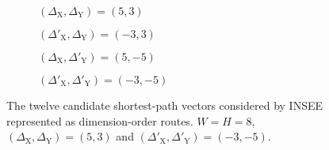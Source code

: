 			\begin{figure}
				\center
				\begin{subfigure}{0.45\linewidth}
					\center
					\caption{$(\Delta_\textrm{X}, \Delta_\textrm{Y}) = (5,3)$}
					\label{fig:insee-vector-candidates-no-wrap}
				\end{subfigure}
				\begin{subfigure}{0.45\linewidth}
					\center
					\caption{$(\Delta'_\textrm{X}, \Delta_\textrm{Y}) = (-3,3)$}
					\label{fig:insee-vector-candidates-wrap-x}
				\end{subfigure}
				
				\vspace{1em}
				
				\begin{subfigure}{0.45\linewidth}
					\center
					\caption{$(\Delta_\textrm{X}, \Delta'_\textrm{Y}) = (5,-5)$}
					\label{fig:insee-vector-candidates-wrap-y}
				\end{subfigure}
				\begin{subfigure}{0.45\linewidth}
					\center
					\caption{$(\Delta'_\textrm{X}, \Delta'_\textrm{Y}) = (-3,-5)$}
					\label{fig:insee-vector-candidates-wrap}
				\end{subfigure}
				
				\vspace{1em}
				
				
				\caption{The twelve candidate shortest-path vectors considered by INSEE
				represented as dimension-order routes. $W=H=8$,
				$(\Delta_\textrm{X},\Delta_\textrm{Y}) = (5, 3)$ and
				$(\Delta'_\textrm{X},\Delta'_\textrm{Y}) = (-3, -5)$.}
				\label{fig:insee-vector-candidates}
			\end{figure}
			
